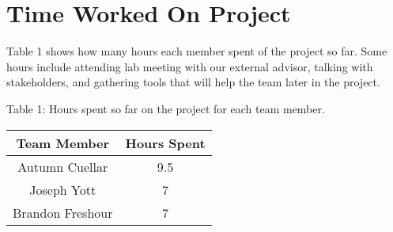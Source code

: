 \section{Time Worked On Project}
\label{sect:time_worked_on_project}

Table 1 shows how many hours each member spent of the project so far. Some hours include attending lab meeting with our external advisor, talking with stakeholders, and gathering tools that will help the team later in the project.

\begin{center}
Table 1: Hours spent so far on the project for each team member.

    \begin{tabular}{|c|c|}
    \hline
        Team Member & Hours Spent \\
    \hline\hline
         Autumn Cuellar & 9.5 \\
    \hline
         Joseph Yott & 7 \\
    \hline
         Brandon Freshour & 7 \\
    \hline
    \end{tabular}

\end{center}


